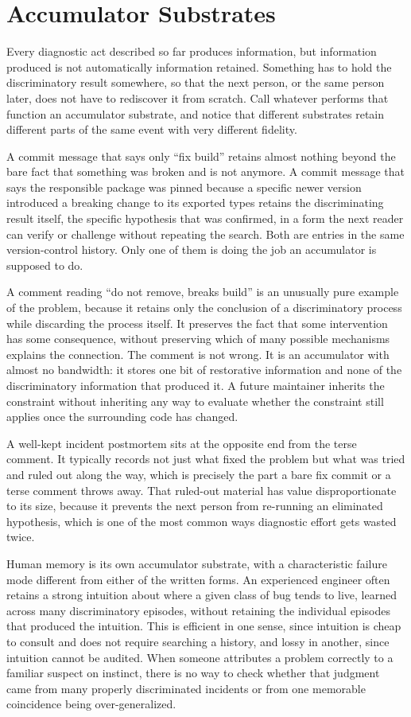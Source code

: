 \documentclass[11pt]{article}
\begin{document}
\section{Accumulator Substrates}

Every diagnostic act described so far produces information, but information produced is not automatically information retained. Something has to hold the discriminatory result somewhere, so that the next person, or the same person later, does not have to rediscover it from scratch. Call whatever performs that function an accumulator substrate, and notice that different substrates retain different parts of the same event with very different fidelity.

A commit message that says only ``fix build'' retains almost nothing beyond the bare fact that something was broken and is not anymore. A commit message that says the responsible package was pinned because a specific newer version introduced a breaking change to its exported types retains the discriminating result itself, the specific hypothesis that was confirmed, in a form the next reader can verify or challenge without repeating the search. Both are entries in the same version-control history. Only one of them is doing the job an accumulator is supposed to do.

A comment reading ``do not remove, breaks build'' is an unusually pure example of the problem, because it retains only the conclusion of a discriminatory process while discarding the process itself. It preserves the fact that some intervention has some consequence, without preserving which of many possible mechanisms explains the connection. The comment is not wrong. It is an accumulator with almost no bandwidth: it stores one bit of restorative information and none of the discriminatory information that produced it. A future maintainer inherits the constraint without inheriting any way to evaluate whether the constraint still applies once the surrounding code has changed.

A well-kept incident postmortem sits at the opposite end from the terse comment. It typically records not just what fixed the problem but what was tried and ruled out along the way, which is precisely the part a bare fix commit or a terse comment throws away. That ruled-out material has value disproportionate to its size, because it prevents the next person from re-running an eliminated hypothesis, which is one of the most common ways diagnostic effort gets wasted twice.

Human memory is its own accumulator substrate, with a characteristic failure mode different from either of the written forms. An experienced engineer often retains a strong intuition about where a given class of bug tends to live, learned across many discriminatory episodes, without retaining the individual episodes that produced the intuition. This is efficient in one sense, since intuition is cheap to consult and does not require searching a history, and lossy in another, since intuition cannot be audited. When someone attributes a problem correctly to a familiar suspect on instinct, there is no way to check whether that judgment came from many properly discriminated incidents or from one memorable coincidence being over-generalized.
\end{document}
